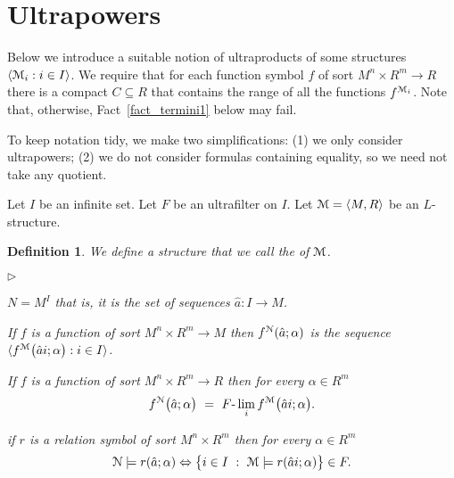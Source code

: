 \documentclass[12pt,letterpaper,oneside,reqno]{amsart}
\newcommand{\mylabel}[1]{{#1}\hfill}
\renewenvironment{itemize}
  {\begin{list}{$\triangleright$}{%
   \setlength{\parskip}{0mm}
   \setlength{\topsep}{.2\baselineskip}
   \setlength{\rightmargin}{0mm}
   \setlength{\listparindent}{0mm}
   \setlength{\itemindent}{0mm}
   \setlength{\labelwidth}{3ex}
   \setlength{\itemsep}{.2\baselineskip}
   \setlength{\parsep}{.2\baselineskip}
   \setlength{\partopsep}{0mm}
   \setlength{\labelsep}{1ex}
   \setlength{\leftmargin}{\labelwidth+\labelsep}
   \let\makelabel\mylabel}}{%
   \end{list}}
\theoremstyle{plain}
\newtheorem{definition}[theorem]{Definition}
\theoremstyle{remark}
\renewcommand*{\emph}[1]{%
   \smash{\tikz[baseline]\node[rectangle, fill=olive!25, rounded corners, inner xsep=0.5ex, inner ysep=0.2ex, anchor=base, minimum height = 2.7ex]{#1};}}
\begin{document}
\section{Ultrapowers}\label{ultrapws}

\def\ceq#1#2#3{\parbox[t]{25ex}{$\displaystyle #1$}\parbox{5ex}{\hfil $#2$}{$\displaystyle #3$}}

Below we introduce a suitable notion of ultraproducts of some structures $\langle{\EuScript M}_i:i\in I\rangle$.
We require that for each function symbol $f$ of sort $M^n\times R^m\to R$ there is a compact $C\subseteq R$ that contains the range of all the functions $f^{{\EuScript M}_i}$.
Note that, otherwise, Fact~\ref{fact_termini1} below may fail.

To keep notation tidy, we make two simplifications: 
(1) we only consider ultrapowers; 
(2) we do not consider formulas containing equality, so we need not take any quotient.

Let $I$ be an infinite set.
Let $F$ be an ultrafilter on $I$.
Let ${\EuScript M}=\langle  M,R\rangle$ be an $L$-structure.

\begin{definition}\label{def_ultraproduct}
  We define a structure \emph{${\EuScript N}=\langle  N,R\rangle$\/} that we call the \emph{ultrapower\/} of ${\EuScript M}$.
  \begin{itemize}
    \item[1.] $N=M^I$ that is, it is the set of sequences $\hat a: I\to M$.
    \item[2.] If $f$ is a function of sort $ M^n\times R^m\to  M$ then $f^{\EuScript N}(\hat a;\alpha)$ is the sequence 
    $\langle f^{\EuScript M}\big(\hat ai;\alpha\big):i\in I\rangle$.
    \item[4.] If $f$ is a function of sort $ M^n\times R^m\to R$ then for every $\alpha\in R^m$
    $$
    f^{\EuScript N}\big(\hat a;\alpha\big)\ =\ F\mbox{-}\lim_if^{\EuScript M}\big(\hat ai;\alpha\big).
    $$ 
    \item[3.] if $r$ is a relation symbol of sort $M^n\times R^m$ then for every $\alpha\in R^m$
    $$
    {\EuScript N}\models r(\hat a; \alpha)
    \Leftrightarrow
    \big\{ i\in I\ :\ {\EuScript M}\models r(\hat ai;\alpha)\big\}\in F.
    $$
  \end{itemize}
\end{definition}
\end{document}
